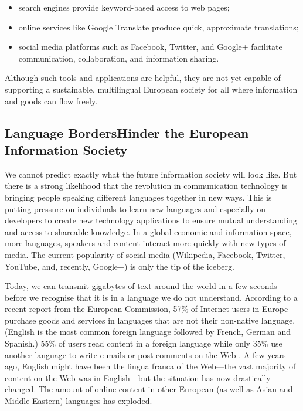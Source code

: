 \begin{multicols}{2}
\begin{itemize}
      \item search engines provide keyword-based access to web pages;
      \item online services like Google Translate produce quick, approximate translations;
      \item social media platforms such as Facebook, Twitter, and Google+ facilitate communication, collaboration, and information sharing.
    \end{itemize}
    Although such tools and applications are helpful, they are not yet capable of supporting a sustainable, multilingual European society for all where information and goods can flow freely.

\subsection[Language Borders Hinder the European Information Society]{Language Borders\newline Hinder the European Information Society}

    We cannot predict exactly what the future information society will look like. But there is a strong likelihood that the revolution in communication technology is bringing people speaking different languages together in new ways. This is putting pressure on individuals to learn new languages and especially on developers to create new technology applications to ensure mutual understanding and access to shareable knowledge. In a global economic and information space, more languages, speakers and content interact more quickly with new types of media. The current popularity of social media (Wikipedia, Facebook, Twitter, YouTube, and, recently, Google+) is only the tip of the iceberg.


    Today, we can transmit gigabytes of text around the world in a few seconds before we recognise that it is in a language we do not understand. According to a recent report from the European Commission, 57\% of Internet users in Europe purchase goods and services in languages that are not their non-native language. (English is the most common foreign language followed by French, German and Spanish.) 55\% of users read content in a foreign language while only 35\% use another language to write e-mails or post comments on the Web \cite{CAT-Nota1}. A few years ago, English might have been the lingua franca of the Web—the vast majority of content on the Web was in English—but the situation has now drastically changed. The amount of online content in other European (as well as Asian and Middle Eastern) languages has exploded.


\end{multicols}
